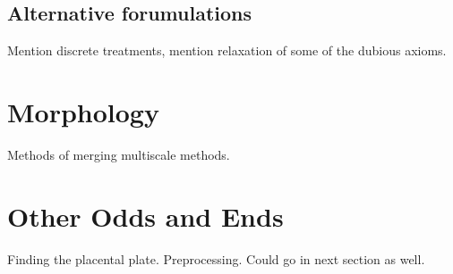 \subsection{Alternative forumulations}
	Mention discrete treatments, mention relaxation of some of the dubious axioms.
\section{Morphology}
	Methods of merging multiscale methods.
	
	
\hrulefill
\section{Other Odds and Ends}
	Finding the placental plate. Preprocessing. Could go in next section as well.



